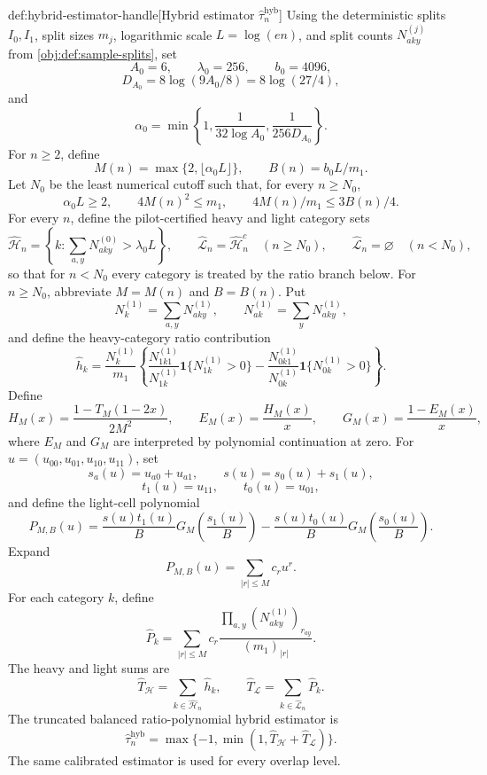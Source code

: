 \begin{definitionv}{def:hybrid-estimator-handle}[Hybrid estimator \(\widehat\tau_n^{\mathrm{hyb}}\)]
Using the deterministic splits \(I_0,I_1\), split sizes \(m_j\), logarithmic scale \(L=\log(en)\), and split counts \(N^{(j)}_{aky}\) from \cref{obj:def:sample-splits}, set
\[
A_0=6,\qquad \lambda_0=256,\qquad b_0=4096,
\]
\[
D_{A_0}=8\log(9A_0/8)=8\log(27/4),
\]
and
\[
\alpha_0=\min\left\{1,\frac1{32\log A_0},\frac1{256D_{A_0}}\right\}.
\]
For \(n\ge2\), define
\[
M(n)=\max\{2,\lfloor\alpha_0L\rfloor\},\qquad B(n)=b_0L/m_1.
\]
Let \(N_0\) be the least numerical cutoff such that, for every \(n\ge N_0\),
\[
\alpha_0L\ge2,\qquad 4M(n)^2\le m_1,\qquad 4M(n)/m_1\le 3B(n)/4.
\]
For every \(n\), define the pilot-certified heavy and light category sets
\[
\widehat{\mathcal H}_n
=
\left\{k:\sum_{a,y}N^{(0)}_{aky}>\lambda_0L\right\},
\qquad
\widehat{\mathcal L}_n=\widehat{\mathcal H}_n^c\quad(n\ge N_0),
\qquad
\widehat{\mathcal L}_n=\varnothing\quad(n<N_0),
\]
so that for \(n<N_0\) every category is treated by the ratio branch below. For \(n\ge N_0\), abbreviate \(M=M(n)\) and \(B=B(n)\).
Put
\[
N_k^{(1)}=\sum_{a,y}N^{(1)}_{aky},
\qquad
N_{ak}^{(1)}=\sum_yN^{(1)}_{aky},
\]
and define the heavy-category ratio contribution
\[
\widehat h_k
=
\frac{N_k^{(1)}}{m_1}
\left\{
\frac{N^{(1)}_{1k1}}{N^{(1)}_{1k}}\mathbf1\{N^{(1)}_{1k}>0\}
-
\frac{N^{(1)}_{0k1}}{N^{(1)}_{0k}}\mathbf1\{N^{(1)}_{0k}>0\}
\right\}.
\]
Define
\[
H_M(x)=\frac{1-T_M(1-2x)}{2M^2},
\qquad
E_M(x)=\frac{H_M(x)}{x},
\qquad
G_M(x)=\frac{1-E_M(x)}{x},
\]
where \(E_M\) and \(G_M\) are interpreted by polynomial continuation at zero. For \(u=(u_{00},u_{01},u_{10},u_{11})\), set
\[
s_a(u)=u_{a0}+u_{a1},\qquad s(u)=s_0(u)+s_1(u),
\]
\[
t_1(u)=u_{11},\qquad t_0(u)=u_{01},
\]
and define the light-cell polynomial
\[
P_{M,B}(u)
=
\frac{s(u)t_1(u)}B
G_M\!\left(\frac{s_1(u)}B\right)
-
\frac{s(u)t_0(u)}B
G_M\!\left(\frac{s_0(u)}B\right).
\]
Expand
\[
P_{M,B}(u)=\sum_{|r|\le M}c_ru^r.
\]
For each category \(k\), define
\[
\widehat P_k
=
\sum_{|r|\le M}
c_r
\frac{\prod_{a,y}(N^{(1)}_{aky})_{r_{ay}}}{(m_1)_{|r|}}.
\]
The heavy and light sums are
\[
\widehat T_{\mathcal H}
=
\sum_{k\in\widehat{\mathcal H}_n}\widehat h_k,
\qquad
\widehat T_{\mathcal L}
=
\sum_{k\in\widehat{\mathcal L}_n}\widehat P_k.
\]
The truncated balanced ratio-polynomial hybrid estimator is
\[
\widehat\tau_n^{\mathrm{hyb}}
=
\max\{-1,\min(1,\widehat T_{\mathcal H}+\widehat T_{\mathcal L})\}.
\]
The same calibrated estimator is used for every overlap level.
\end{definitionv}

